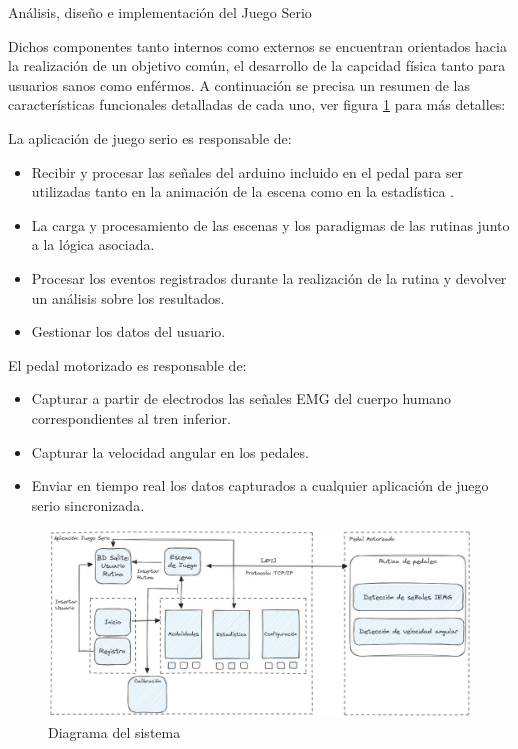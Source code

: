 \begin{thesischapter}{2} {Análisis, diseño e implementación del Juego Serio}
    
    Dichos componentes tanto internos como externos se encuentran orientados hacia 
    la realización de un objetivo común, el desarrollo de la capcidad física tanto para usuarios 
    sanos como enférmos. A continuación se precisa un resumen de las características funcionales 
    detalladas de cada uno, ver figura \ref{fig: system} para más detalles:

    \vspace{10pt}
    La aplicación de juego serio es responsable de:
    \begin{itemize}
        \item Recibir y procesar las señales del arduino incluido en el pedal para ser utilizadas tanto en la 
              animación de la escena como en la estadística .
        \item La carga y procesamiento de las escenas y los paradigmas de las rutinas junto a la lógica asociada. 
        \item Procesar los eventos registrados durante la realización de la rutina y devolver un análisis sobre los resultados.
        \item Gestionar los datos del usuario.
    \end{itemize}

    \vspace{10pt}
    El pedal motorizado es responsable de:
    \begin{itemize}
        \item Capturar a partir de electrodos las señales EMG del cuerpo humano correspondientes al tren inferior.
        \item Capturar la velocidad angular en los pedales.
        \item Enviar en tiempo real los datos capturados a cualquier aplicación de juego serio sincronizada.
    \end{itemize}
    
    \begin{figure}[ht]
        \centering
        \includegraphics[scale=0.38]{images/system.jpg}
        \caption{Diagrama del sistema}
        \label{fig: system}
    \end{figure} 
    

\end{thesischapter}

